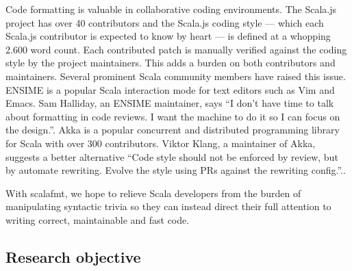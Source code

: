 Code formatting is valuable in collaborative coding environments.
The Scala.js project\autocite{_scala.js_????} has over 40 contributors and the Scala.js coding style\autocite{doeraene_scala.js_2015} --- which each Scala.js contributor is expected to know by heart --- is defined at a whopping 2.600 word count.
Each contributed patch is manually verified against the coding style by the project maintainers.
This adds a burden on both contributors and maintainers.
Several prominent Scala community members have raised this issue.
ENSIME\autocite{_ensime_????} is a popular Scala interaction mode for text editors such as Vim and Emacs.
Sam Halliday, an ENSIME maintainer, says ``I don't have time to talk about formatting in code reviews. I want the machine to do it so I can focus on the design.''\autocite{halliday_i_2016-1}.
Akka\autocite{_akka_????} is a popular concurrent and distributed programming library for Scala with over 300 contributors.
Viktor Klang, a maintainer of Akka, suggests a better alternative ``Code style should not be enforced by review, but by automate rewriting. Evolve the style using PRs against the rewriting config.''.\autocite{klang_code_2016}.

With scalafmt, we hope to relieve Scala developers from the burden of manipulating syntactic trivia so they can instead direct their full attention to writing correct, maintainable and fast code.

\subsection{Research objective}

